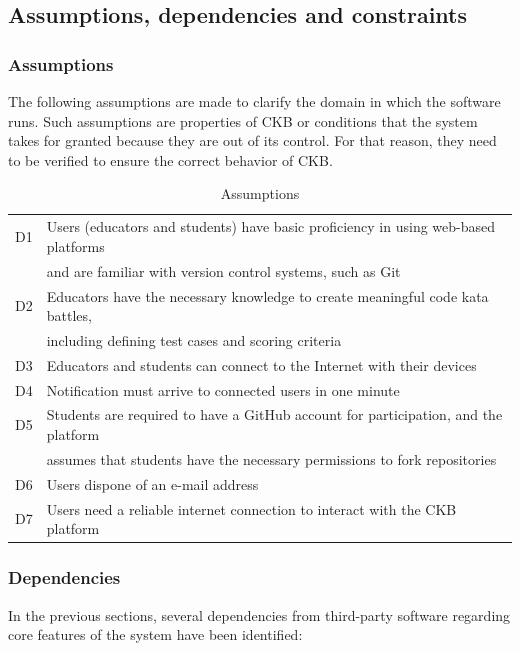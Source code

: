 \newpage

\subsection {Assumptions, dependencies and constraints}

\subsubsection{Assumptions}
The following assumptions are made to clarify the domain in which the software runs. Such assumptions are properties of CKB or conditions that the system takes for granted because they are out of its control. For that reason, they need to be verified to ensure the correct behavior of CKB.

\begin{table}[h]
    \centering
    \begin{tabular}{|l|l|}
    \hline
        D1 & Users (educators and students) have basic proficiency in using web-based platforms \\
        & and are familiar with version control systems, such as Git\\
    \hline
        D2 & Educators have the necessary knowledge to create meaningful code kata battles,\\ 
        & including defining test cases and scoring criteria \\
    \hline
        D3 & Educators and students can connect to the Internet with their devices \\
    \hline
        D4 & Notification must arrive to connected users in one minute \\
    \hline
        D5 & Students are required to have a GitHub account for participation, and the platform \\ & assumes that students have the necessary permissions to fork repositories \\
    \hline
        D6 & Users dispone of an e-mail address \\
    \hline
        D7 & Users need a reliable internet connection to interact with the CKB platform\\
    \hline
    \end{tabular}
    \caption{Assumptions}
    \label{tab:assumptions}
\end{table}

\subsubsection{Dependencies}
In the previous sections, several dependencies from third-party software regarding core features of the system have been identified:

